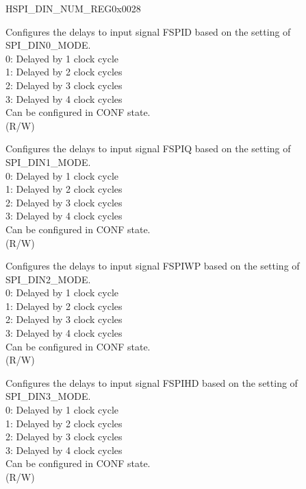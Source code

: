 \begin{register}{H}{SPI\_DIN\_NUM\_REG}{0x0028}\label{regdesc:SPIDINNUMREG}
%
%
%
%
%
%
%
%
%
\regnewline%
\begin{regdesc}\begin{reglist}
\label{fielddesc:SPIDIN0NUM}\item [SPI\_DIN0\_NUM] Configures the delays to input signal FSPID based on the setting of SPI\_DIN0\_MODE.\\
0: Delayed by 1 clock cycle\\
1: Delayed by 2 clock cycles\\
2: Delayed by 3 clock cycles\\
3: Delayed by 4 clock cycles\\
Can be configured in CONF state.\\ (R/W)
\label{fielddesc:SPIDIN1NUM}\item [SPI\_DIN1\_NUM] Configures the delays to input signal FSPIQ based on the setting of SPI\_DIN1\_MODE.\\
0: Delayed by 1 clock cycle\\
1: Delayed by 2 clock cycles\\
2: Delayed by 3 clock cycles\\
3: Delayed by 4 clock cycles\\
Can be configured in CONF state.\\ (R/W)
\label{fielddesc:SPIDIN2NUM}\item [SPI\_DIN2\_NUM] Configures the delays to input signal FSPIWP based on the setting of SPI\_DIN2\_MODE.\\
0: Delayed by 1 clock cycle\\
1: Delayed by 2 clock cycles\\
2: Delayed by 3 clock cycles\\
3: Delayed by 4 clock cycles\\
Can be configured in CONF state.\\ (R/W)
\label{fielddesc:SPIDIN3NUM}\item [SPI\_DIN3\_NUM] Configures the delays to input signal FSPIHD based on the setting of SPI\_DIN3\_MODE.\\
0: Delayed by 1 clock cycle\\
1: Delayed by 2 clock cycles\\
2: Delayed by 3 clock cycles\\
3: Delayed by 4 clock cycles\\
Can be configured in CONF state.\\ (R/W)

\item [Continued on the next page...]
\end{reglist}\end{regdesc}
\end{register}

